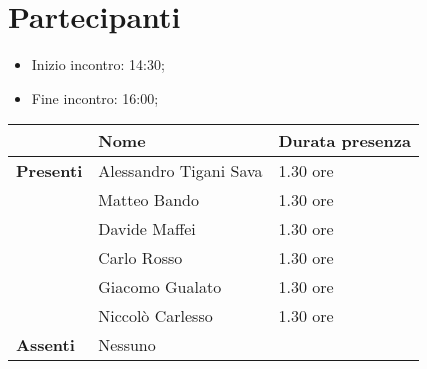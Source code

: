 \section{Partecipanti}

\begin{itemize}
    \item Inizio incontro: 14:30;
	\item Fine incontro: 16:00;
\end{itemize}


\begin{center}
{\renewcommand{\arraystretch}{1.5}
\begin{tabular}{l|ll}
	                    & \textbf{Nome}  & \textbf{Durata presenza} 	\\
	\hline
	\textbf{Presenti}   & Alessandro Tigani Sava            & 1.30 ore     
	\\  & Matteo Bando           & 1.30 ore     
	\\  & Davide Maffei          & 1.30 ore     
	\\  & Carlo Rosso            & 1.30 ore     
	\\  & Giacomo Gualato        & 1.30 ore    
	\\  & Niccolò Carlesso       & 1.30 ore     \\
	\hline
	\textbf{Assenti}	& 	     Nessuno    &	        \\
\end{tabular}	
}
\end{center}
